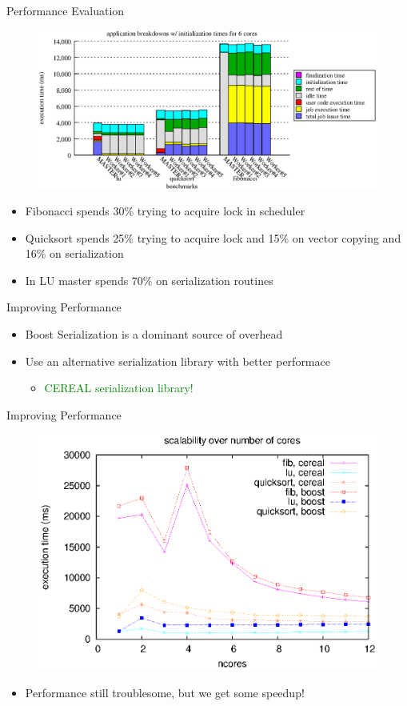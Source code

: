 \documentclass[svgnames]{beamer}
\begin{document}
\begin{frame}{Performance Evaluation}
\begin{figure}
\center
\includegraphics[width=.8\textwidth]{images/app_breakdowns_w_init}
\end{figure}
\begin{itemize}
	\item Fibonacci spends 30\% trying to acquire lock in scheduler 
	\item Quicksort spends 25\% trying to acquire lock and 15\% on vector copying and 16\% on serialization
	\item In LU master spends 70\% on serialization routines
\end{itemize}
\end{frame}
\begin{frame}{Improving Performance}
\begin{itemize}
	\item Boost Serialization is a dominant source of overhead 
	\item Use an alternative serialization library with better performace
	\begin{itemize}
		\item \textcolor{green}{CEREAL serialization library!}
	\end{itemize}
\end{itemize}
\end{frame}

\begin{frame}{Improving Performance}
\begin{figure}
\center
\includegraphics[width=.7\textwidth]{images/apps_scalability_minititan_cereal}
\end{figure}
\begin{itemize}
	\item Performance still troublesome, but we get some speedup!
\end{itemize}
\end{frame}
\end{document}
